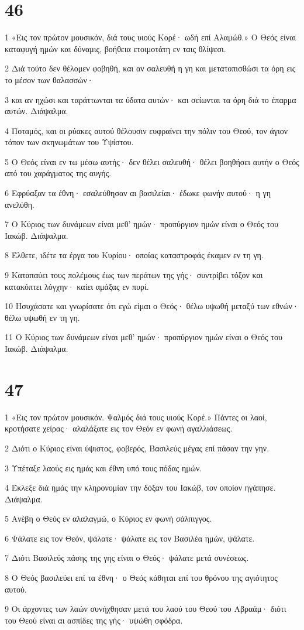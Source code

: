 \chapter{46}

\par 1 «Εις τον πρώτον μουσικόν, διά τους υιούς Κορέ· ωδή επί Αλαμώθ.» Ο Θεός είναι καταφυγή ημών και δύναμις, βοήθεια ετοιμοτάτη εν ταις θλίψεσι.
\par 2 Διά τούτο δεν θέλομεν φοβηθή, και αν σαλευθή η γη και μετατοπισθώσι τα όρη εις το μέσον των θαλασσών·
\par 3 και αν ηχώσι και ταράττωνται τα ύδατα αυτών· και σείωνται τα όρη διά το έπαρμα αυτών. Διάψαλμα.
\par 4 Ποταμός, και οι ρύακες αυτού θέλουσιν ευφραίνει την πόλιν του Θεού, τον άγιον τόπον των σκηνωμάτων του Υψίστου.
\par 5 Ο Θεός είναι εν τω μέσω αυτής· δεν θέλει σαλευθή· θέλει βοηθήσει αυτήν ο Θεός από του χαράγματος της αυγής.
\par 6 Εφρύαξαν τα έθνη· εσαλεύθησαν αι βασιλείαι· έδωκε φωνήν αυτού· η γη ανελύθη.
\par 7 Ο Κύριος των δυνάμεων είναι μεθ' ημών· προπύργιον ημών είναι ο Θεός του Ιακώβ. Διάψαλμα.
\par 8 Έλθετε, ιδέτε τα έργα του Κυρίου· οποίας καταστροφάς έκαμεν εν τη γη.
\par 9 Καταπαύει τους πολέμους έως των περάτων της γής· συντρίβει τόξον και κατακόπτει λόγχην· καίει αμάξας εν πυρί.
\par 10 Ησυχάσατε και γνωρίσατε ότι εγώ είμαι ο Θεός· θέλω υψωθή μεταξύ των εθνών· θέλω υψωθή εν τη γη.
\par 11 Ο Κύριος των δυνάμεων είναι μεθ' ημών· προπύργιον ημών είναι ο Θεός του Ιακώβ. Διάψαλμα.

\chapter{47}

\par 1 «Εις τον πρώτον μουσικόν. Ψαλμός διά τους υιούς Κορέ.» Πάντες οι λαοί, κροτήσατε χείρας· αλαλάξατε εις τον Θεόν εν φωνή αγαλλιάσεως.
\par 2 Διότι ο Κύριος είναι ύψιστος, φοβερός, Βασιλεύς μέγας επί πάσαν την γην.
\par 3 Υπέταξε λαούς εις ημάς και έθνη υπό τους πόδας ημών.
\par 4 Έκλεξε διά ημάς την κληρονομίαν την δόξαν του Ιακώβ, τον οποίον ηγάπησε. Διάψαλμα.
\par 5 Ανέβη ο Θεός εν αλαλαγμώ, ο Κύριος εν φωνή σάλπιγγος.
\par 6 Ψάλατε εις τον Θεόν, ψάλατε· ψάλατε εις τον Βασιλέα ημών, ψάλατε.
\par 7 Διότι Βασιλεύς πάσης της γης είναι ο Θεός· ψάλατε μετά συνέσεως.
\par 8 Ο Θεός βασιλεύει επί τα έθνη· ο Θεός κάθηται επί του θρόνου της αγιότητος αυτού.
\par 9 Οι άρχοντες των λαών συνήχθησαν μετά του λαού του Θεού του Αβραάμ· διότι του Θεού είναι αι ασπίδες της γής· υψώθη σφόδρα.

